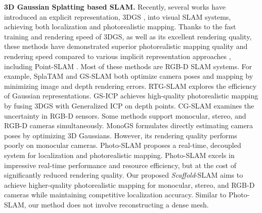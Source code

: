 

\noindent\textbf{3D Gaussian Splatting based SLAM.} 
Recently, several works have introduced an explicit representation, 3DGS \cite{3DGS2023}, into visual SLAM systems, achieving both localization and photorealistic mapping. Thanks to the fast training and rendering speed of 3DGS, as well as its excellent rendering quality, these methods have demonstrated superior photorealistic mapping quality and rendering speed compared to various implicit representation approaches \cite{NICE-SLAM2022, Vox-Fusion2022, Orbeez-SLAM2023, ESLAM2023,Co-SLAM2023, GO-SLAM2023,Point-SLAM2023}, including Point-SLAM \cite{Point-SLAM2023}. Most of these methods are RGB-D SLAM systems. For example, SplaTAM \cite{SplaTAM2024} and GS-SLAM \cite{GS-SLAM2024} both optimize camera poses and mapping by minimizing image and depth rendering errors. RTG-SLAM \cite{RTG-SLAM2024} explores the efficiency of Gaussian representations. GS-ICP \cite{GS-ICPSLAM2024} achieves high-quality photorealistic mapping by fusing 3DGS with Generalized ICP on depth points. CG-SLAM \cite{CG-SLAM2024} examines the uncertainty in RGB-D sensors. Some methods support monocular, stereo, and RGB-D cameras simultaneously. MonoGS \cite{MonoGS2024} formulates directly estimating camera poses by optimizing 3D Gaussians. However, its rendering quality performs poorly on monocular cameras. Photo-SLAM \cite{Photo-SLAM2024} proposes a real-time, decoupled system for localization and photorealistic mapping. Photo-SLAM excels in impressive real-time performance and resource efficiency, but at the cost of significantly reduced rendering quality. Our proposed \emph{Scaffold}-SLAM aims to achieve higher-quality photorealistic mapping for monocular, stereo, and RGB-D cameras while maintaining competitive localization accuracy. Similar to Photo-SLAM, our method does not involve reconstructing a dense mesh.

